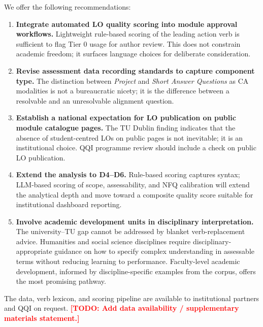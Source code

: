\documentclass[12pt, a4paper]{article}
\newcommand{\todo}[1]{\textcolor{red}{\textbf{[TODO: #1]}}}
\begin{document}
We offer the following recommendations:

\begin{enumerate}
  \item \textbf{Integrate automated LO quality scoring into module approval workflows.}
    Lightweight rule-based scoring of the leading action verb is sufficient to flag
    Tier 0 usage for author review. This does not constrain academic freedom; it
    surfaces language choices for deliberate consideration.

  \item \textbf{Revise assessment data recording standards to capture component type.}
    The distinction between \textit{Project} and \textit{Short Answer Questions} as
    CA modalities is not a bureaucratic nicety; it is the difference between a
    resolvable and an unresolvable alignment question.

  \item \textbf{Establish a national expectation for LO publication on public module
    catalogue pages.} The TU Dublin finding indicates that the absence of student-centred
    LOs on public pages is not inevitable; it is an institutional choice. QQI programme
    review should include a check on public LO publication.

  \item \textbf{Extend the analysis to D4--D6.} Rule-based scoring captures syntax;
    LLM-based scoring of scope, assessability, and NFQ calibration will extend the
    analytical depth and move toward a composite quality score suitable for
    institutional dashboard reporting.

  \item \textbf{Involve academic development units in disciplinary interpretation.}
    The university--TU gap cannot be addressed by blanket verb-replacement advice.
    Humanities and social science disciplines require disciplinary-appropriate guidance
    on how to specify complex understanding in assessable terms without reducing
    learning to performance. Faculty-level academic development, informed by
    discipline-specific examples from the corpus, offers the most promising pathway.
\end{enumerate}

The data, verb lexicon, and scoring pipeline are available to institutional partners
and QQI on request. \todo{Add data availability / supplementary materials statement.}
\label{sec:data-availability}

\end{document}
